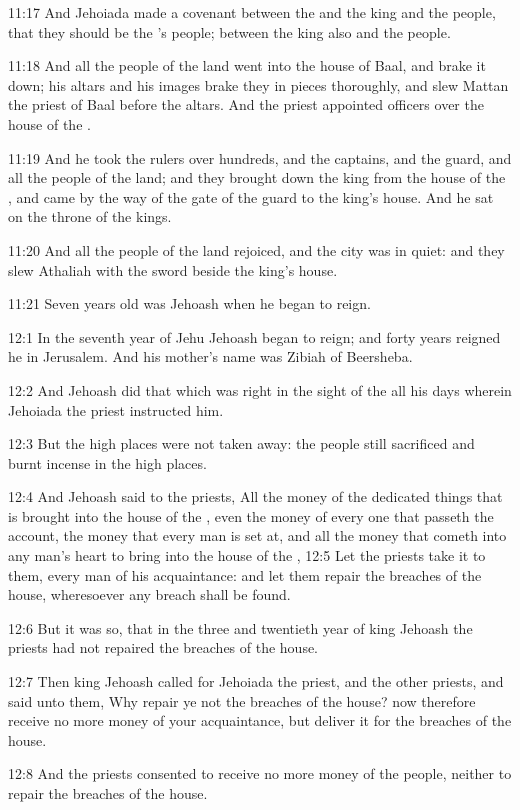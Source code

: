 11:17 And Jehoiada made a covenant between the \LORD and the king and
the people, that they should be the \LORD's people; between the king
also and the people.

11:18 And all the people of the land went into the house of Baal, and
brake it down; his altars and his images brake they in pieces
thoroughly, and slew Mattan the priest of Baal before the altars. And
the priest appointed officers over the house of the \LORD.

11:19 And he took the rulers over hundreds, and the captains, and the
guard, and all the people of the land; and they brought down the king
from the house of the \LORD, and came by the way of the gate of the
guard to the king's house. And he sat on the throne of the kings.

11:20 And all the people of the land rejoiced, and the city was in
quiet: and they slew Athaliah with the sword beside the king's house.

11:21 Seven years old was Jehoash when he began to reign.

12:1 In the seventh year of Jehu Jehoash began to reign; and forty
years reigned he in Jerusalem. And his mother's name was Zibiah of
Beersheba.

12:2 And Jehoash did that which was right in the sight of the \LORD all
his days wherein Jehoiada the priest instructed him.

12:3 But the high places were not taken away: the people still
sacrificed and burnt incense in the high places.

12:4 And Jehoash said to the priests, All the money of the dedicated
things that is brought into the house of the \LORD, even the money of
every one that passeth the account, the money that every man is set
at, and all the money that cometh into any man's heart to bring into
the house of the \LORD, 12:5 Let the priests take it to them, every man
of his acquaintance: and let them repair the breaches of the house,
wheresoever any breach shall be found.

12:6 But it was so, that in the three and twentieth year of king
Jehoash the priests had not repaired the breaches of the house.

12:7 Then king Jehoash called for Jehoiada the priest, and the other
priests, and said unto them, Why repair ye not the breaches of the
house? now therefore receive no more money of your acquaintance, but
deliver it for the breaches of the house.

12:8 And the priests consented to receive no more money of the people,
neither to repair the breaches of the house.

